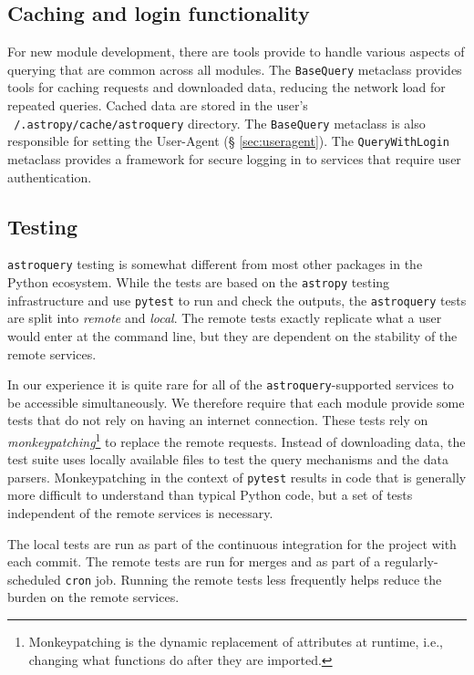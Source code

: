 \documentclass[twocolumn]{aastex62}
\newcommand{\package}[1]{\texttt{#1}\xspace}
\newcommand{\astroquery}{\package{astroquery}}
\newcommand{\astropypkg}{\package{astropy}}
\begin{document}
\subsection{Caching and login functionality}
For new module development, there are tools provide to handle various aspects
of querying that are common across all modules.  The \texttt{BaseQuery}
metaclass provides tools for caching requests and downloaded data, reducing the
network load for repeated queries.  Cached data are stored in the user's
\texttt{~/.astropy/cache/astroquery} directory.  The \texttt{BaseQuery}
metaclass is also responsible for setting the User-Agent (\S
\ref{sec:useragent}).  The \texttt{QueryWithLogin} metaclass provides a
framework for secure logging in to services that require user
authentication.



\subsection{Testing}
\astroquery testing is somewhat different from most other packages in the Python
ecosystem.  While the tests are based on the \astropypkg testing infrastructure and use
\package{pytest} to run and check the outputs, the \astroquery tests are split into
\emph{remote} and \emph{local}.  The remote tests exactly replicate what a user
would enter at the command line, but they are dependent on the stability of the
remote services.

In our experience it is quite rare for all of the \astroquery-supported
services to be accessible simultaneously. We therefore require that each
module provide some tests that do not rely on having an internet connection.
These tests rely on \emph{monkeypatching}\footnote{Monkeypatching is the
  dynamic replacement of attributes at runtime, i.e., changing what
  functions do after they are imported.} to replace the remote
requests. Instead of downloading data, the test suite uses locally available
files to test the query mechanisms and the data parsers.  Monkeypatching in
the context of \package{pytest} results in code that is generally more
difficult to understand than typical Python code, but a set of tests
independent of the remote services is necessary.

The local tests are run as part of the continuous integration for the
project with each commit.  The remote tests are run for merges and as part of a
regularly-scheduled \texttt{cron} job.  Running the remote tests less frequently
helps reduce the burden on the remote services.
\end{document}
